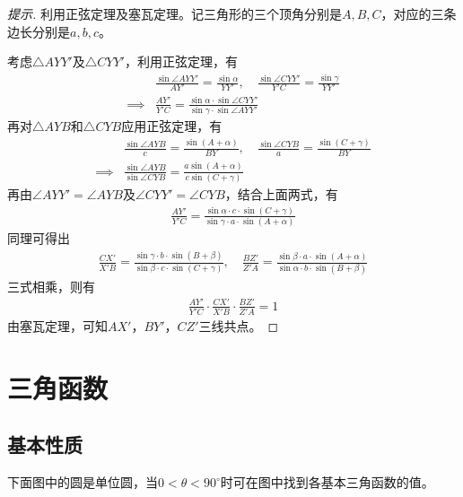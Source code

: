 \begin{proof}[提示]利用正弦定理及塞瓦定理。记三角形的三个顶角分别是$A,B,C$，对应的三条边长分别是$a,b,c$。

  考虑$\triangle AYY'$及$\triangle CYY'$，利用正弦定理，有
  \begin{align*}
    &\frac{\sin\angle AYY'}{AY'} = \frac{\sin\alpha}{YY'}, \quad
      \frac{\sin\angle CYY'}{Y'C} = \frac{\sin\gamma}{YY'}\\
    \implies& \frac{AY'}{Y'C} = \frac{\sin\alpha\cdot \sin\angle CYY'}{\sin\gamma\cdot\sin\angle AYY'}
  \end{align*}
  再对$\triangle AYB$和$\triangle CYB$应用正弦定理，有
  \begin{align*}
    &\frac{\sin\angle AYB}{c}=\frac{\sin(A+\alpha)}{BY},\quad
      \frac{\sin\angle CYB}{a}=\frac{\sin(C+\gamma)}{BY}\\
    \implies& \frac{\sin\angle AYB}{\sin\angle CYB}=\frac{a\sin(A+\alpha)}{c\sin(C+\gamma)}
  \end{align*}
  再由$\angle AYY' = \angle AYB$及$\angle CYY'=\angle CYB$，结合上面两式，有
  \begin{align*}
    \frac{AY'}{Y'C} = \frac{\sin\alpha\cdot c\cdot\sin(C+\gamma)}{\sin\gamma\cdot a\cdot\sin(A+\alpha)}
  \end{align*}
  同理可得出
  \begin{align*}
    \frac{CX'}{X'B}=\frac{\sin\gamma\cdot b\cdot\sin(B+\beta)}{\sin\beta\cdot c\cdot\sin(C+\gamma)},\quad
    \frac{BZ'}{Z'A}=\frac{\sin\beta\cdot a\cdot\sin(A+\alpha)}{\sin\alpha\cdot b\cdot\sin(B+\beta)}
  \end{align*}
  三式相乘，则有
  \begin{align*}
    \frac{AY'}{Y'C}\cdot\frac{CX'}{X'B}\cdot\frac{BZ'}{Z'A}=1
  \end{align*}
  由塞瓦定理，可知$AX'$，$BY'$，$CZ'$三线共点。
\end{proof}

\section{三角函数}
\label{sec:trigometric-functions}

\subsection{基本性质}
\label{sec:basic-properties-of-trigonometric-functions}

下面图中的圆是单位圆，当$0<\theta<90^\circ$时可在图中找到各基本三角函数的值。

